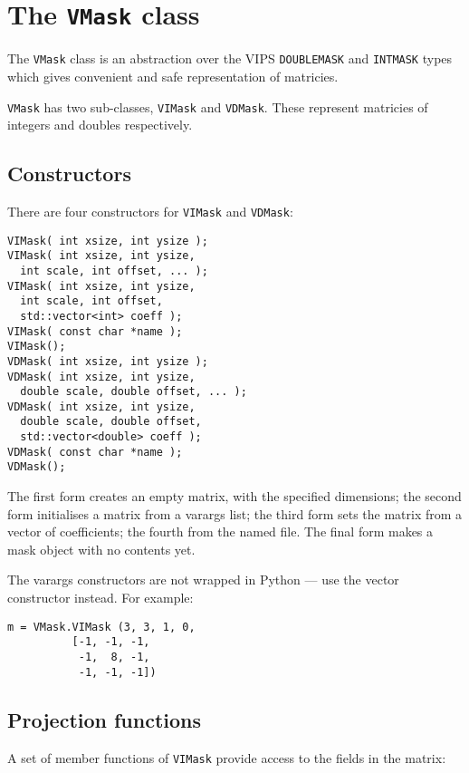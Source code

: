 \section{The \texttt{VMask} class}

The \verb+VMask+ class is an abstraction over the VIPS \verb+DOUBLEMASK+ and
\verb+INTMASK+ types which gives convenient and safe representation of
matricies.

\verb+VMask+ has two sub-classes, \verb+VIMask+ and \verb+VDMask+. These
represent matricies of integers and doubles respectively.

\subsection{Constructors}

There are four constructors for \verb+VIMask+ and \verb+VDMask+:

\begin{verbatim}
VIMask( int xsize, int ysize );
VIMask( int xsize, int ysize, 
  int scale, int offset, ... );
VIMask( int xsize, int ysize, 
  int scale, int offset, 
  std::vector<int> coeff );
VIMask( const char *name );
VIMask();
VDMask( int xsize, int ysize );
VDMask( int xsize, int ysize, 
  double scale, double offset, ... );
VDMask( int xsize, int ysize, 
  double scale, double offset, 
  std::vector<double> coeff );
VDMask( const char *name );
VDMask();
\end{verbatim}

The first form creates an empty matrix, with the specified dimensions;
the second form initialises a matrix from a varargs list; the third form
sets the matrix from a vector of coefficients; the fourth from the named file. 
The final form makes a mask object with no contents yet.

The varargs constructors are not wrapped in Python --- use the vector
constructor instead. For example:

\begin{verbatim}
m = VMask.VIMask (3, 3, 1, 0, 
		  [-1, -1, -1,
		   -1,  8, -1,
		   -1, -1, -1])
\end{verbatim}

\subsection{Projection functions}

A set of member functions of \verb+VIMask+ provide access to the fields in
the matrix:

